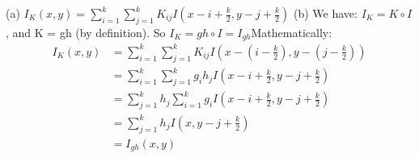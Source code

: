 \documentclass{article} %
\begin{document}
\begin{flushleft}
\begin{enumerate}
            \bigbreak (a) $I_{K}(x, y) = \sum_{i=1}^{k}\sum_{j=1}^{k}K_{ij}I(x-i+\frac{k}{2}, y - j + \frac{k}{2})$
            \bigbreak (b) We have: $I_{K} = K \circ I $ , and K = gh (by definition). So $I_{K} = gh \circ I =  I_{gh}$\break Mathematically: \begin{equation} \begin{split}I_{K}(x, y)& = \sum_{i=1}^{k}\sum_{j=1}^{k}K_{ij}I(x-(i-\frac{k}{2}), y - (j - \frac{k}{2}))\\
                    & = \sum_{i=1}^{k}\sum_{j=1}^{k}g_{i}h_{j}I(x-i+\frac{k}{2}, y - j + \frac{k}{2}) \\
                    & = \sum_{j=1}^{k}h_{j}\sum_{i=1}^{k}g_{i}I(x-i+\frac{k}{2}, y - j + \frac{k}{2}) \\
                    & = \sum_{j=1}^{k}h_{j}I(x, y - j + \frac{k}{2}) \\
                    & = I_{gh}(x, y) 
            \end{split}\end{equation}
        \end{enumerate}

    \end{flushleft}
\end{document}
